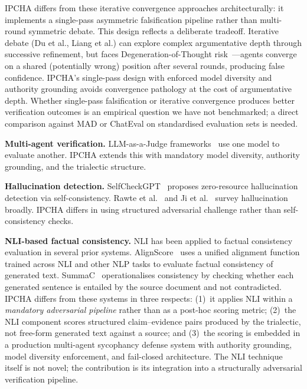 \documentclass[11pt,a4paper]{article}
\begin{document}
IPCHA differs from these iterative convergence approaches
architecturally: it implements a single-pass asymmetric falsification
pipeline rather than multi-round symmetric debate.  This design
reflects a deliberate tradeoff.  Iterative debate
(Du et al., Liang et al.) can explore complex argumentative depth
through successive refinement, but faces Degeneration-of-Thought
risk~\cite{liang2023divergent}---agents converge on a shared
(potentially wrong) position after several rounds, producing false
confidence.  IPCHA's single-pass design with enforced model diversity
and authority grounding avoids convergence pathology at the cost of
argumentative depth.  Whether single-pass falsification or iterative
convergence produces better verification outcomes is an empirical
question we have not benchmarked; a direct comparison against MAD or
ChatEval on standardised evaluation sets is needed.

\textbf{Multi-agent verification.}
LLM-as-a-Judge frameworks~\cite{zheng2023judge} use one model to
evaluate another.  IPCHA extends this with mandatory model diversity,
authority grounding, and the trialectic structure.

\textbf{Hallucination detection.}
SelfCheckGPT~\cite{manakul2023selfcheckgpt} proposes zero-resource
hallucination detection via self-consistency.
Rawte et al.~\cite{rawte2023hallucination} and
Ji et al.~\cite{ji2023hallucination} survey hallucination broadly.
IPCHA differs in using structured adversarial challenge rather than
self-consistency checks.

\textbf{NLI-based factual consistency.}
NLI has been applied to factual consistency evaluation in several
prior systems.
AlignScore~\cite{zha2023alignscore} uses a unified alignment
function trained across NLI and other NLP tasks to evaluate factual
consistency of generated text.
SummaC~\cite{laban2022summac} operationalises consistency by checking
whether each generated sentence is entailed by the source document
and not contradicted.
IPCHA differs from these systems in three respects: (1)~it applies
NLI within a \emph{mandatory adversarial pipeline} rather than as a
post-hoc scoring metric; (2)~the NLI component scores structured
claim--evidence pairs produced by the trialectic, not free-form
generated text against a source; and (3)~the scoring is embedded in a
production multi-agent sycophancy defense system with authority
grounding, model diversity enforcement, and fail-closed architecture.
The NLI technique itself is not novel; the contribution is its
integration into a structurally adversarial verification pipeline.
\end{document}
